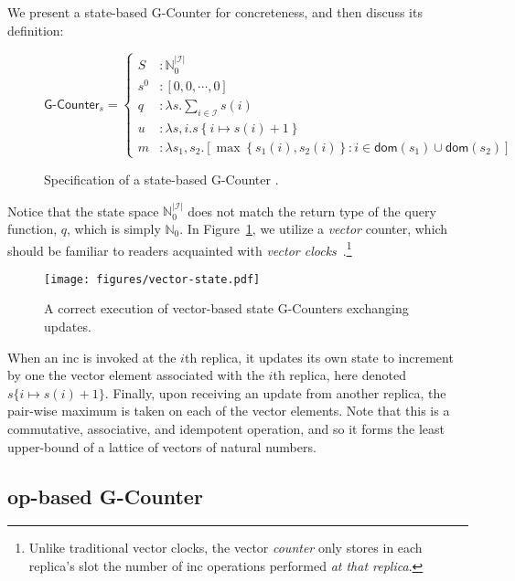 We present a state-based G-Counter \CRDT for concreteness, and then discuss its
definition:

\begin{figure}[H]
  \centering
  \[
    \textsf{G-Counter}_s = \left\{\begin{aligned}
      S &: \mathbb{N}_0^{|\mathcal{I}|} \\
      s^0 &: \left[ 0, 0, \cdots, 0 \right] \\
      q &: \lambda s. \sum_{i \in \mathcal{I}} s(i) \\
      u &: \lambda s,i. s\left\{ i \mapsto s(i) + 1 \right\} \\
      m &: \lambda s_1, s_2. \left[ \max\left\{ s_1(i), s_2(i) \right\}: i \in \mathsf{dom}(s_1) \cup
      \mathsf{dom}(s_2) \right]
    \end{aligned}\right.
  \]
  \caption{Specification of a state-based \textsf{G-Counter} \CRDT.}
  \label{fig:state-gcounter}
\end{figure}

Notice that the state space $\mathbb{N}^{|\mathcal{I}|}_0$ does not match the
return type of the query function, $q$, which is simply $\mathbb{N}_0$. In
Figure~\ref{fig:state-gcounter}, we utilize a \emph{vector} counter, which
should be familiar to readers acquainted with \emph{vector
clocks}~\citep{lamport78}.\footnote{Unlike traditional vector clocks, the vector
\emph{counter} only stores in each replica's slot the number of \textsf{inc}
operations performed \emph{at that replica}.}

\begin{figure}[H]
  \centering
  \texttt{[image: figures/vector-state.pdf]}
    \caption{A correct execution of vector-based state G-Counters exchanging
      updates.}
\end{figure}

When an \textsf{inc} is invoked at the $i$th replica, it updates its own state
to increment by one the vector element associated with the $i$th replica, here
denoted $s\{i \mapsto s(i) + 1\}$. Finally, upon receiving an update from
another replica, the pair-wise maximum is taken on each of the vector elements.
Note that this is a commutative, associative, and idempotent operation, and so
it forms the least upper-bound of a lattice of vectors of natural numbers.

\subsection{op-based G-Counter}

